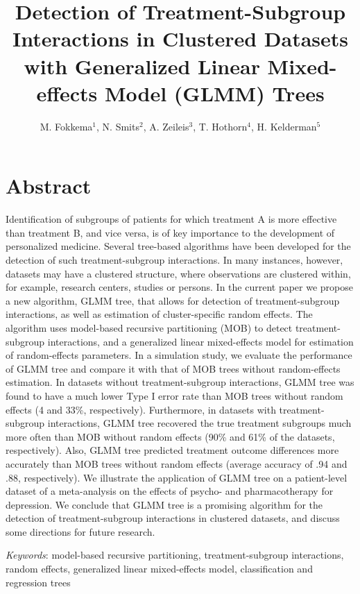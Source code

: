 \documentclass[nobf,doc]{apa}
\title{Detection of Treatment-Subgroup Interactions in Clustered Datasets with Generalized Linear Mixed-effects Model (GLMM) Trees}
\author{M. Fokkema$^1$, N. Smits$^2$, A. Zeileis$^3$, T. Hothorn$^4$, H. Kelderman$^5$}
\affiliation{$^1$Universiteit Leiden, $^2$Universiteit van Amsterdam, $^3$Universit\"{a}t Innsbruck, $^4$Universit\"{a}t Z\"{u}rich, $^5$Universiteit Leiden and Vrije Universiteit, Amsterdam}
\begin{document}
\maketitle
\pagewiselinenumbers

\section{Abstract}
Identification of subgroups of patients for which treatment A is more effective than treatment B, and vice versa, is of key importance to the development of personalized medicine. Several tree-based algorithms have been developed for the detection of such treatment-subgroup interactions. In many instances, however, datasets may have a clustered structure, where observations are clustered within, for example, research centers, studies or persons. In the current paper we propose a new algorithm, GLMM tree, that allows for detection of treatment-subgroup interactions, as well as estimation of cluster-specific random effects. The algorithm uses model-based recursive partitioning (MOB) to detect treatment-subgroup interactions, and a generalized linear mixed-effects model for estimation of random-effects parameters. In a simulation study, we evaluate the performance of GLMM tree and compare it with that of MOB trees without random-effects estimation. In datasets without treatment-subgroup interactions, GLMM tree was found to have a much lower Type I error rate than MOB trees without random effects (4 and 33\%, respectively). Furthermore, in datasets with treatment-subgroup interactions, GLMM tree recovered the true treatment subgroups much more often than MOB without random effects (90\% and 61\% of the datasets, respectively). Also, GLMM tree predicted treatment outcome differences more accurately than MOB trees without random effects (average accuracy of .94 and .88, respectively). We illustrate the application of GLMM tree on a patient-level dataset of a meta-analysis on the effects of psycho- and pharmacotherapy for depression. We conclude that GLMM tree is a promising algorithm for the detection of treatment-subgroup interactions in clustered datasets, and discuss some directions for future research.

\textit{Keywords}: model-based recursive partitioning, treatment-subgroup interactions, random effects, generalized linear mixed-effects model, classification and regression trees
\end{document}
